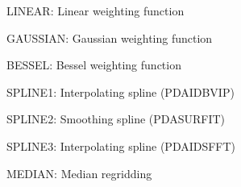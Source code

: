 \documentclass[twoside,11pt]{article}
\newcommand{\xref}[3]{#1}
\renewcommand{\_}{\texttt{\symbol{95}}}
\newcommand{\sstitem}{\item}
\newcommand{\sstitem}{\item}
\begin{document}
{{{{            \sstitem
            LINEAR:  Linear weighting function

            \sstitem
            GAUSSIAN: Gaussian weighting function

            \sstitem
            BESSEL:  Bessel weighting function

            \sstitem
            SPLINE1: Interpolating spline 
                (\xref{PDA\_IDBVIP}{sun194}{PDA_IDBVIP})

            \sstitem
            SPLINE2: Smoothing spline 
                (\xref{PDA\_SURFIT}{sun194}{PDA_SURFIT})

            \sstitem
            SPLINE3: Interpolating spline 
                (\xref{PDA\_IDSFFT}{sun194}{PDA_IDSFFT})

            \sstitem
            MEDIAN: Median regridding

}}}}
\end{document}
